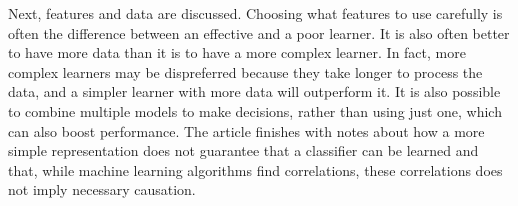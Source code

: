 \documentclass[12pt]{article}
\begin{document}
Next, features and data are discussed. Choosing what features to use carefully is often the difference between an effective and a poor learner. It is also often better to have more data than it is to have a more complex learner. In fact, more complex learners may be dispreferred because they take longer to process the data, and a simpler learner with more data will outperform it. It is also possible to combine multiple models to make decisions, rather than using just one, which can also boost performance. The article finishes with notes about how a more simple representation does not guarantee that a classifier can be learned and that, while machine learning algorithms find correlations, these correlations does not imply necessary causation.
\end{document}
